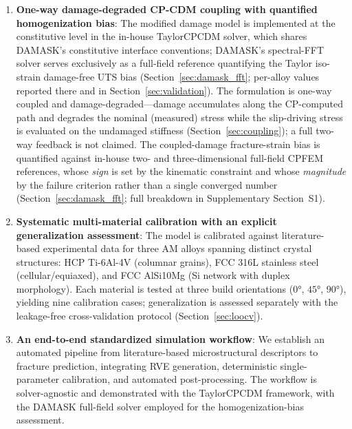 \begin{enumerate}
    \item \textbf{One-way damage-degraded CP-CDM coupling with quantified homogenization bias}: The modified damage model is implemented at the constitutive level in the in-house TaylorCPCDM solver, which shares DAMASK's constitutive interface conventions; DAMASK's spectral-FFT solver serves exclusively as a full-field reference quantifying the Taylor iso-strain damage-free UTS bias (Section~\ref{sec:damask_fft}; per-alloy values reported there and in Section~\ref{sec:validation}). The formulation is one-way coupled and damage-degraded---damage accumulates along the CP-computed path and degrades the nominal (measured) stress while the slip-driving stress is evaluated on the undamaged stiffness (Section~\ref{sec:coupling}); a full two-way feedback is not claimed. The coupled-damage fracture-strain bias is quantified against in-house two- and three-dimensional full-field CPFEM references, whose \emph{sign} is set by the kinematic constraint and whose \emph{magnitude} by the failure criterion rather than a single converged number (Section~\ref{sec:damask_fft}; full breakdown in Supplementary Section~S1).
    
    \item \textbf{Systematic multi-material calibration with an explicit generalization assessment}: The model is calibrated against literature-based experimental data for three AM alloys spanning distinct crystal structures: HCP Ti-6Al-4V (columnar grains), FCC 316L stainless steel (cellular/equiaxed), and FCC AlSi10Mg (Si network with duplex morphology). Each material is tested at three build orientations ($\ang{0}$, $\ang{45}$, $\ang{90}$), yielding nine calibration cases; generalization is assessed separately with the leakage-free cross-validation protocol (Section~\ref{sec:loocv}).
    
    \item \textbf{An end-to-end standardized simulation workflow}: We establish an automated pipeline from literature-based microstructural descriptors to fracture prediction, integrating RVE generation, deterministic single-parameter calibration, and automated post-processing. The workflow is solver-agnostic and demonstrated with the TaylorCPCDM framework, with the DAMASK full-field solver employed for the homogenization-bias assessment.
\end{enumerate}

